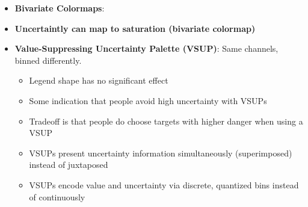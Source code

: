 \documentclass{report}
\begin{document}
\begin{itemize}
\begin{enumerate}
                \item \textbf{Warm colors and blue}
                \item \textbf{Avoid too little contrast to background}
            \end{enumerate}
        \item \textbf{Bivariate Colormaps}: 
            \bigbreak \noindent 
        \item \textbf{Uncertaintly can map to saturation (bivariate colormap)}
            \bigbreak \noindent 
        \item \textbf{Value-Suppressing Uncertainty Palette (VSUP)}:  Same channels, binned differently.
            \bigbreak \noindent 
            \begin{itemize}
                \item Legend shape has no significant effect
                \item Some indication that people avoid high uncertainty with VSUPs
                \item Tradeoff is that people do choose targets with higher danger when using a VSUP
                \item VSUPs present uncertainty information simultaneously (superimposed) instead of juxtaposed
                \item VSUPs encode value and uncertainty via discrete, quantized bins instead of continuously
            \end{itemize}

    \end{itemize}

    \pagebreak 
\end{document}
